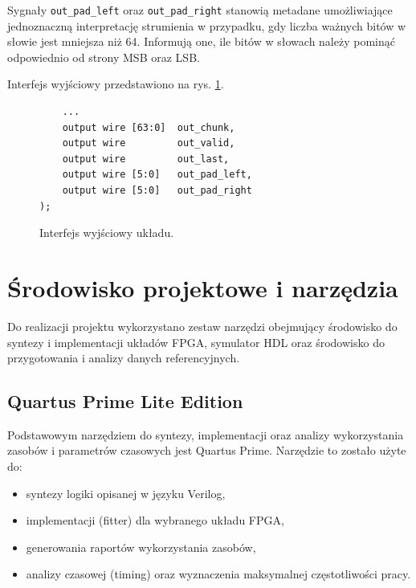 Sygnały \texttt{out\_pad\_left} oraz \texttt{out\_pad\_right} stanowią metadane umożliwiające jednoznaczną interpretację strumienia w przypadku, gdy liczba ważnych bitów w słowie jest mniejsza niż 64. Informują one, ile bitów w słowach należy pominąć odpowiednio od strony MSB oraz LSB.

Interfejs wyjściowy przedstawiono na rys. \ref{fig:pdschtx_if_out}.

\begin{figure}[!ht]
\centering
\begin{minipage}{0.95\linewidth}
\begin{lstlisting}
    ...
    output wire [63:0]  out_chunk,
    output wire         out_valid,
    output wire         out_last,
    output wire [5:0]   out_pad_left,
    output wire [5:0]   out_pad_right
);
\end{lstlisting}
\end{minipage}
\caption{Interfejs wyjściowy układu.}
\label{fig:pdschtx_if_out}
\end{figure}


\section{Środowisko projektowe i narzędzia}
\label{sec:srodowisko_i_narzedzia}

Do realizacji projektu wykorzystano zestaw narzędzi obejmujący środowisko do syntezy i implementacji układów FPGA, symulator HDL oraz środowisko do przygotowania i analizy danych referencyjnych.

\subsection{Quartus Prime Lite Edition}
Podstawowym narzędziem do syntezy, implementacji oraz analizy wykorzystania zasobów i parametrów czasowych jest Quartus Prime. Narzędzie to zostało użyte do:
\begin{itemize}
    \item syntezy logiki opisanej w języku Verilog,
    \item implementacji (fitter) dla wybranego układu FPGA,
    \item generowania raportów wykorzystania zasobów,
    \item analizy czasowej (timing) oraz wyznaczenia maksymalnej częstotliwości pracy.
\end{itemize}

